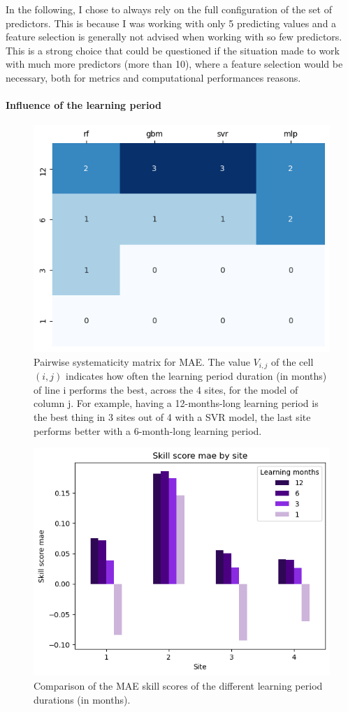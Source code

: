 In the following, I chose to always rely on the full configuration of the set of predictors. This is because I was working with only 5 predicting values and a feature selection is generally not advised when working with so few predictors.
This is a strong choice that could be questioned if the situation made to work with much more predictors (more than 10), where a feature selection would be necessary, both for metrics and computational performances reasons.
\paragraph{Influence of the learning period}
\indent
\begin{figure}[htb!]
    \centering
    \includegraphics[width=0.7\columnwidth]{figures/first_study/comp_learning_period_mae.png}
\caption{Pairwise systematicity matrix for MAE. The value $V_{i,j}$ of the cell $(i,j)$ indicates how often the learning period duration (in months) of line i performs the best, across the 4 sites, for the model of column j. For example, having a 12-months-long learning period is the best thing in 3 sites out of 4 with a SVR model, the last site performs better with a 6-month-long learning period.}
\label{fig:matrix_period}
\end{figure}

\newpage
\begin{figure}[htb!]
    \centering
    \includegraphics[width=0.70\columnwidth]{figures/first_study/comp_learning_period_mae_svr.png}
\caption{Comparison of the MAE skill scores of the different learning period durations (in months).}
    \label{fig:ss_period}
\end{figure}

